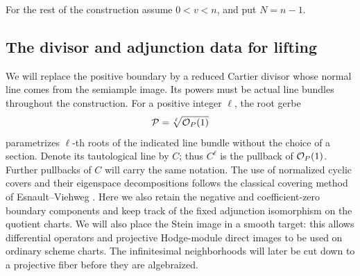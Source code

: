 For the rest of the construction assume $0<v<n$, and put $N=n-1$.

\subsection{The divisor and adjunction data for lifting}

We will replace the positive boundary by a reduced Cartier divisor
whose normal line comes from the semiample image.  Its powers must
be actual line bundles throughout the construction.  For a positive
integer $\ell$, the root gerbe
\[
 \mathcal P=\sqrt[\ell]{\mathcal{O}_P(1)}
\]
parametrizes $\ell$-th roots of the indicated line bundle without
the choice of a section.  Denote its tautological line by $C$;
thus $C^\ell$ is the pullback of $\mathcal{O}_P(1)$.  Further pullbacks
of $C$ will carry the same notation.
The use of normalized cyclic covers and their eigenspace
decompositions follows the classical covering method of
Esnault--Viehweg
\cite[Section~3.5, Claim~3.10 and Corollary~3.11]
{EsnaultViehweg1992}.  Here we also retain the negative and
coefficient-zero boundary components and keep track of the fixed
adjunction isomorphism on the quotient charts.
We will also place the Stein image in a smooth target: this allows
differential operators and projective Hodge-module direct images to be
used on ordinary scheme charts. The infinitesimal neighborhoods will
later be cut down to a projective fiber before they are algebraized.

